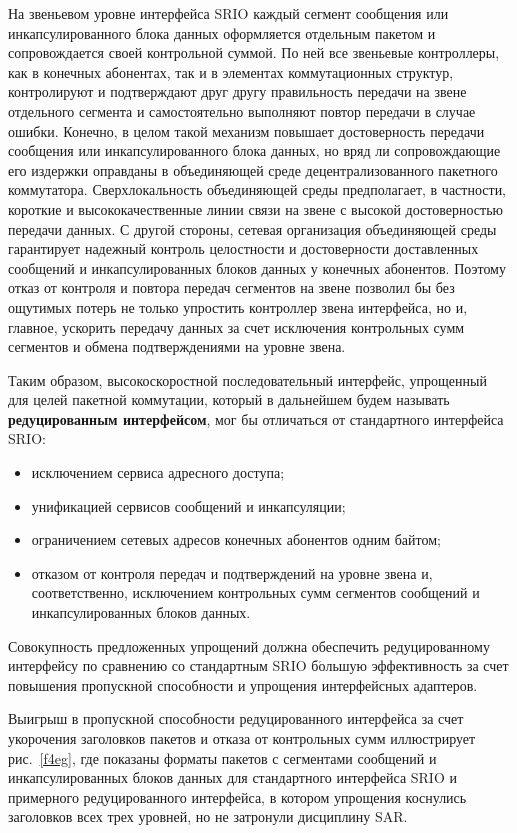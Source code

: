 \begin{multicols}{2}
     
     На звеньевом уровне интерфейса SRIO каждый сегмент сообщения или 
инкапсулированного блока данных оформляется отдельным пакетом и сопровождается своей 
контрольной суммой. По ней все звеньевые контроллеры, как в конечных абонентах, так и в 
элементах коммутационных структур, контролируют и подтверждают друг другу 
правильность передачи на звене отдельного сегмента и самостоятельно выполняют повтор 
передачи в случае ошибки. Конечно, в целом такой механизм повышает достоверность 
передачи сообщения или инкапсулированного блока данных, но вряд ли сопровождающие 
его издержки оправданы в объединяющей среде децентрализованного пакетного 
коммутатора. Сверхлокальность объединяющей среды предполагает, в частности, короткие и 
высококачественные линии связи на звене с высокой достоверностью передачи данных. С 
другой стороны, сетевая организация объединяющей среды гарантирует надежный контроль 
целостности и достоверности доставленных сообщений и инкапсулированных блоков 
данных у конечных абонентов. Поэтому отказ от контроля и повтора передач сегментов на 
звене позволил бы без ощутимых потерь не только упростить контроллер звена интерфейса, 
но и, главное, ускорить передачу данных за счет исключения контрольных сумм сегментов и 
обмена подтверждениями на уровне звена.
     
     Таким образом, высокоскоростной последовательный интерфейс, упрощенный для 
целей пакетной коммутации, который в дальнейшем будем называть 
\textbf{редуцированным интерфейсом}, мог бы отличаться от стандартного интерфейса 
SRIO:
     \begin{itemize}
\item  исключением сервиса адресного доступа;
\item  унификацией сервисов сообщений и инкапсуляции;
\item  ограничением сетевых адресов конечных абонентов одним байтом;
\item  отказом от контроля передач и подтверждений на уровне звена и, соответственно, 
исключением контрольных сумм сегментов сообщений и инкапсулированных блоков 
данных.
\end{itemize}
     
     Совокупность предложенных упрощений должна обеспечить редуцированному 
интерфейсу по сравнению со стандартным SRIO б$\acute{\mbox{о}}$льшую эффективность 
за счет повышения пропускной способности и упрощения интерфейсных адаптеров.
     
     Выигрыш в пропускной способности редуцированного интерфейса за счет укорочения 
     заголовков пакетов и отказа от контрольных сумм иллюстрирует рис.~\ref{f4eg}, где 
показаны форматы пакетов с сегментами сообщений и инкапсулированных блоков данных 
для стандартного интерфейса SRIO и примерного редуцированного интерфейса, в котором 
упрощения коснулись заголовков всех трех уровней, но не затронули дисциплину SAR.


\end{multicols}
